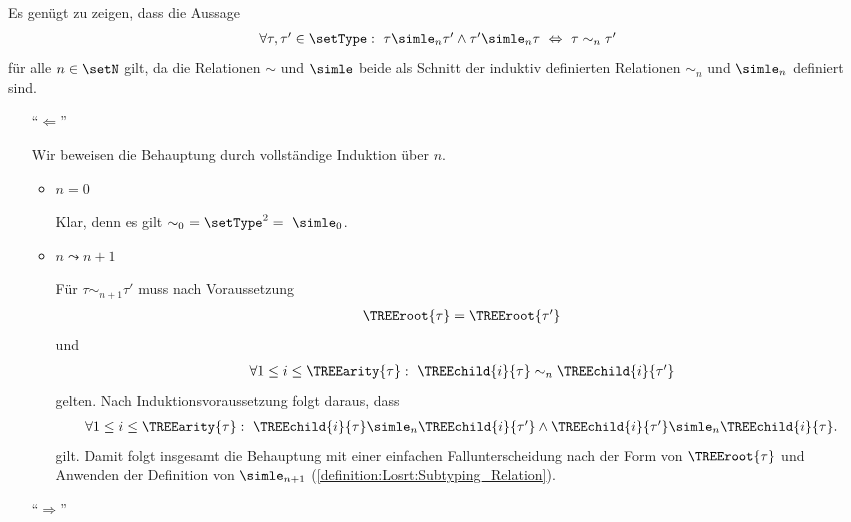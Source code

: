 \begin{beweis}
  Es gen\"ugt zu zeigen, dass die Aussage
  \[\begin{array}{l}
    \forall \tau,\tau'\in\setType:\ \tau \simle_n \tau' \wedge \tau' \simle_n \tau\ \Leftrightarrow\ \tau\sim_n\tau'
  \end{array}\]
  f\"ur alle $n\in\setN$ gilt, da die Relationen $\sim$ und $\simle$ beide als Schnitt der induktiv definierten
  Relationen $\sim_n$ und $\simle_n$ definiert sind.
  \begin{enumerate}
    \item["`$\Leftarrow$"']

          Wir beweisen die Behauptung durch vollst\"andige Induktion \"uber $n$.
          \begin{itemize}
            \item $n = 0$

                  Klar, denn es gilt $\sim_0\ = \setType^2 =\ \simle_0$.

            \item $n \leadsto n+1$

                  F\"ur $\tau \sim_{n+1} \tau'$ muss nach Voraussetzung
                  \[\begin{array}{l}
                    \TREEroot{\tau} = \TREEroot{\tau'}
                  \end{array}\]
                  und
                  \[\begin{array}{l}
                    \forall 1 \le i \le \TREEarity{\tau}:\ \TREEchild{i}{\tau} \sim_n \TREEchild{i}{\tau'}
                  \end{array}\]
                  gelten. Nach Induktionsvoraussetzung folgt daraus, dass
                  \[\begin{array}{l}
                    \forall 1 \le i \le \TREEarity{\tau}:\ \TREEchild{i}{\tau} \simle_n \TREEchild{i}{\tau'}
                                                    \wedge \TREEchild{i}{\tau'} \simle_n \TREEchild{i}{\tau}.
                  \end{array}\]
                  gilt. Damit folgt insgesamt die Behauptung mit einer einfachen Fallunterscheidung nach der Form von
                  $\TREEroot{\tau}$ und Anwenden der Definition von $\simle_{n+1}$ (\ref{definition:Losrt:Subtyping_Relation}).
          \end{itemize}

    \item["`$\Rightarrow$"']


\end{enumerate}
\end{beweis}
